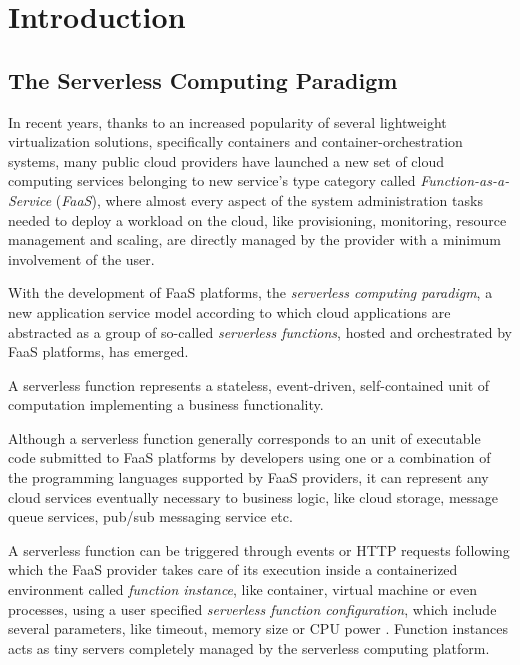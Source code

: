 \documentclass[12pt,a4paper]{report}
\begin{document}
	
\begin{frontespizio} 
\end{frontespizio} 
	
	
\tableofcontents

\chapter{Introduction}

\section{The Serverless Computing Paradigm}

In recent years, thanks to an increased popularity of several lightweight virtualization solutions, specifically containers and container-orchestration systems, many public cloud providers have launched a new set of cloud computing services belonging to new service's type category called \textit{Function-as-a-Service} (\textit{FaaS}), where almost every aspect of the system administration tasks needed to deploy a workload on the cloud, like provisioning, monitoring, resource management and scaling, are directly managed by the provider with a minimum involvement of the user.

With the development of FaaS platforms, the \textit{serverless computing paradigm}, a new application service model according to which cloud applications are abstracted as a group of so-called \textit{serverless functions}, hosted and orchestrated by FaaS platforms, has emerged. 

A serverless function represents a stateless, event-driven, self-contained unit of computation implementing a business functionality.

Although a serverless function generally corresponds to an unit of executable code submitted to FaaS platforms by developers using one or a combination of the programming languages supported by FaaS providers, it can represent any cloud services eventually necessary to business logic, like cloud storage, message queue services, pub/sub messaging service etc.

A serverless function can be triggered through events or HTTP requests following which the FaaS provider takes care of its execution inside a containerized environment called \textit{function instance}, like container, virtual machine or even processes, using a user specified \textit{serverless function configuration}, which include several parameters, like timeout, memory size or CPU power \cite{COSE}. Function instances acts as tiny servers completely managed by the serverless computing platform. 
\end{document}
